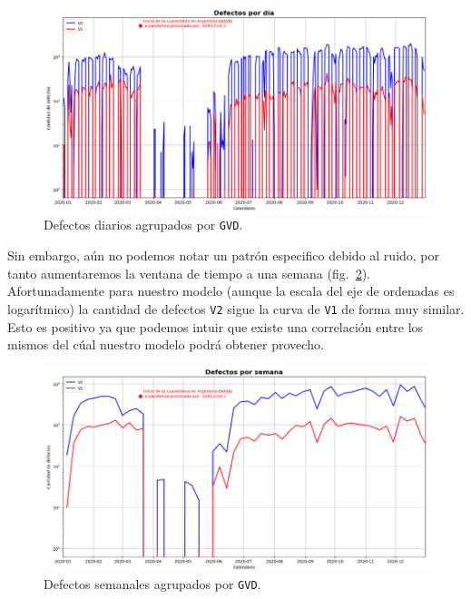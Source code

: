 \documentclass[a4paper,12pt]{article}
\begin{document}
\begin{figure}[H]
	\begin{center}
	\includegraphics[width=1\textwidth]{tesis_64.png}
  	\caption{Defectos diarios agrupados por \texttt{GVD}.}
  	\label{fig:defectsperday}
  	\end{center}
\end{figure}

Sin embargo, aún no podemos notar un patrón especifico debido al ruido, por tanto aumentaremos la ventana de tiempo a una semana (fig.~\ref{fig:defectsperweek}). Afortunadamente para nuestro modelo (aunque la escala del eje de ordenadas es logarítmico) la cantidad de defectos \texttt{V2} sigue la curva de \texttt{V1} de forma muy similar. Esto es positivo ya que podemos intuir que existe una correlación entre los mismos del cúal nuestro modelo podrá obtener provecho.

\begin{figure}[H]
	\begin{center}
	\includegraphics[width=1\textwidth]{tesis_63.png}
  	\caption{Defectos semanales agrupados por \texttt{GVD}.}
  	\label{fig:defectsperweek}
  	\end{center}
\end{figure}
\end{document}
